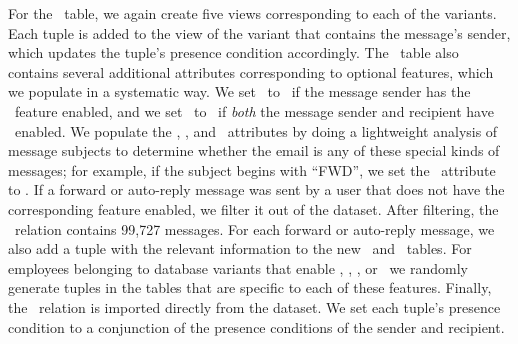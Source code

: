 For the \messages\ table, we again create five views corresponding to each of
the variants. Each tuple is added to the view of the variant that contains the
message's sender, which updates the tuple's presence condition accordingly.
%
The \messages\ table also contains several additional attributes corresponding
to optional features, which we populate in a systematic way.
%
We set \issigned\ to \tru\ if the message sender has the \fsignature\ feature
enabled, and we set \isencrypted\ to \tru\ if \emph{both} the message sender
and recipient have \fencryption\ enabled.
%
We populate the \isforwardmsg, \isautoresponse, and \issystemnotification\
attributes by doing a lightweight analysis of message subjects to determine
whether the email is any of these special kinds of messages; for example, if
the subject begins with ``FWD'', we set the \isforwardmsg\ attribute to \tru.
%
If a forward or auto-reply message was sent by a user that does not have the
corresponding feature enabled, we filter it out of the dataset. After
filtering, the \messages\ relation contains 99,727 messages.
%
For each forward or auto-reply message, we also add a tuple with the relevant
information to the new \forwardmsg\ and \automsg\ tables.
%
For employees belonging to database variants that enable \remailmessage,
\autoresponder, \addressbook, or \mailhost\ we randomly generate tuples in the
tables that are specific to each of these features.
%
Finally, the \recipientinfo\ relation is imported directly from the dataset. We
set each tuple's presence condition to a conjunction of the presence conditions
of the sender and recipient.


%
%


